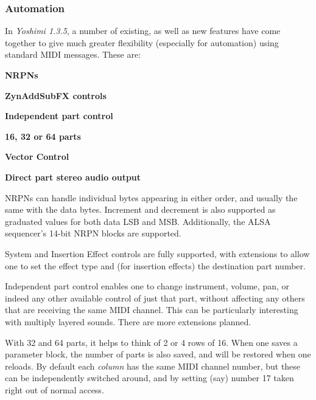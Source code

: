 \subsubsection{Automation}
\label{subsubsec:stock_settings_elements_automation}

   In \textsl{Yoshimi 1.3.5}, a number of existing, as well as new features
   have come together to give much greater flexibility (especially for
   automation) using standard MIDI messages. These are:

   \begin{enumber}
      \item \textbf{NRPNs}
      \item \textbf{ZynAddSubFX controls}
      \item \textbf{Independent part control}
      \item \textbf{16, 32 or 64 parts}
      \item \textbf{Vector Control}
      \item \textbf{Direct part stereo audio output}
   \end{enumber}

   \setcounter{ItemCounter}{0}      %

   NRPNs can handle individual bytes appearing in either order, and usually the
   same with the data bytes. Increment and decrement is also supported as
   graduated values for both data LSB and MSB. Additionally, the ALSA
   sequencer's 14-bit NRPN blocks are supported.

   System and Insertion Effect controls are fully supported, with extensions
   to allow one to set the effect type and (for insertion effects) the
   destination part number.

   Independent part control enables one to change instrument, volume, pan, or
   indeed any other available control of just that part, without affecting any
   others that are receiving the same MIDI channel. This can be particularly
   interesting with multiply layered sounds. There are more extensions planned.

   With 32 and 64 parts, it helps to think of 2 or 4 rows of 16. When one
   saves a parameter block, the number of parts is also saved, and will be
   restored when one reloads.  By default each \textsl{column} has the same
   MIDI channel number, but these can be independently switched around, and
   by setting (say) number 17 taken right out of normal access.

